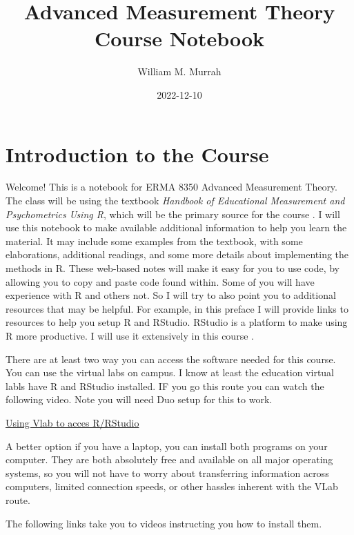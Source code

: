 \documentclass[
]{book}
\title{Advanced Measurement Theory Course Notebook}
\author{William M. Murrah}
\date{2022-12-10}
\begin{document}
\maketitle

{
\setcounter{tocdepth}{1}
\tableofcontents
}
\hypertarget{introduction-to-the-course}{%
\chapter*{Introduction to the Course}\label{introduction-to-the-course}}

Welcome!
This is a notebook for ERMA 8350 Advanced Measurement Theory.
The class will be using the textbook \emph{Handbook of Educational Measurement and Psychometrics Using R}, which will be the primary source for the course .
I will use this notebook to make available additional information to help you learn the material.
It may include some examples from the textbook, with some elaborations, additional readings, and some more details about implementing the methods in R.
These web-based notes will make it easy for you to use code, by allowing you to copy and paste code found within.
Some of you will have experience with R and others not.
So I will try to also point you to additional resources that may be helpful.
For example, in this preface I will provide links to resources to help you setup R and RStudio.
RStudio is a platform to make using R more productive.
I will use it extensively in this course \citep{Desjardins2018Handbookeducationalmeasurement}.

There are at least two way you can access the software needed for this course.
You can use the virtual labs on campus.
I know at least the education virtual labls have R and RStudio installed.
IF you go this route you can watch the following video.
Note you will need Duo setup for this to work.

\href{https://nv.instructuremedia.com/fetch/QkFoYkIxc0hhUVNIRGFrSE1Hd3JCeWhUREdFPS0tZjk4ODFlYWEyZWFiNWQwYWYyZDk0YTZjMjljZTJlMjBkNmIwMzE5Yw.mp4}{Using Vlab to acces R/RStudio}

A better option if you have a laptop, you can install both programs on your computer.
They are both absolutely free and available on all major operating systems, so you will not have to worry about transferring information across computers, limited connection speeds, or other hassles inherent with the VLab route.

The following links take you to videos instructing you how to install them.
\end{document}
